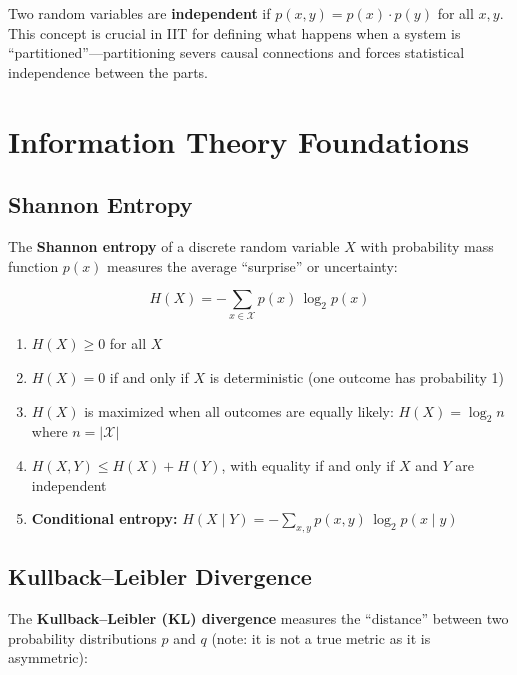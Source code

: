 \documentclass[11pt,a4paper]{report}
\begin{document}
Two random variables are \textbf{independent} if $p(x, y) = p(x) \cdot p(y)$ for all $x, y$. This concept is crucial in IIT for defining what happens when a system is ``partitioned''---partitioning severs causal connections and forces statistical independence between the parts.

\section{Information Theory Foundations}

\subsection{Shannon Entropy}

The \textbf{Shannon entropy} of a discrete random variable $X$ with probability mass function $p(x)$ measures the average ``surprise'' or uncertainty:

\begin{mathbox}
\vspace{-8pt}
\[
  H(X) = -\sum_{x \in \mathcal{X}} p(x)\, \log_2 p(x)
\]
\vspace{-10pt}
\end{mathbox}

\begin{definitionbox}
\begin{enumerate}[label=(\roman*), leftmargin=2em, itemsep=2pt]
  \item $H(X) \geq 0$ for all $X$
  \item $H(X) = 0$ if and only if $X$ is deterministic (one outcome has probability 1)
  \item $H(X)$ is maximized when all outcomes are equally likely: $H(X) = \log_2 n$ where $n = |\mathcal{X}|$
  \item $H(X, Y) \leq H(X) + H(Y)$, with equality if and only if $X$ and $Y$ are independent
  \item \textbf{Conditional entropy:}\; $H(X \mid Y) = -\sum_{x,y} p(x,y)\, \log_2 p(x \mid y)$
\end{enumerate}
\end{definitionbox}

\subsection{Kullback--Leibler Divergence}

The \textbf{Kullback--Leibler (KL) divergence} measures the ``distance'' between two probability distributions $p$ and $q$ (note: it is not a true metric as it is asymmetric):
\end{document}
